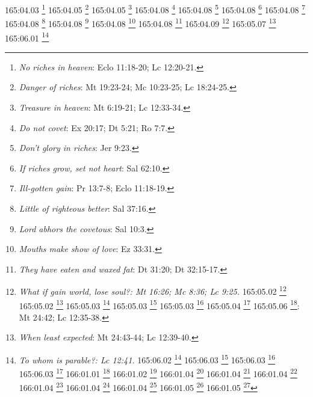 {{{{{{{{{{{{{{{{{{{{{{{{{{{{{{{{{{{{{{{{{{{{165:04.03 \footnote{\textit{No riches in heaven}: Eclo 11:18-20; Lc 12:20-21.}
165:04.05 \footnote{\textit{Danger of riches}: Mt 19:23-24; Mc 10:23-25; Lc 18:24-25.}
165:04.05 \footnote{\textit{Treasure in heaven}: Mt 6:19-21; Lc 12:33-34.}
165:04.08 \footnote{\textit{Do not covet}: Ex 20:17; Dt 5:21; Ro 7:7.}
165:04.08 \footnote{\textit{Don't glory in riches}: Jer 9:23.}
165:04.08 \footnote{\textit{If riches grow, set not heart}: Sal 62:10.}
165:04.08 \footnote{\textit{Ill-gotten gain}: Pr 13:7-8; Eclo 11:18-19.}
165:04.08 \footnote{\textit{Little of righteous better}: Sal 37:16.}
165:04.08 \footnote{\textit{Lord abhors the covetous}: Sal 10:3.}
165:04.08 \footnote{\textit{Mouths make show of love}: Ez 33:31.}
165:04.08 \footnote{\textit{They have eaten and waxed fat}: Dt 31:20; Dt 32:15-17.}
165:04.09 \footnote{\textit{What if gain world, lose soul?: Mt 16:26; Mc 8:36; Lc 9:25.}
165:05.02 \footnote{\textit{Be not anxious about things}: Mt 6:31.}
165:05.02 \footnote{\textit{God provides}: Mt 6:25-27; Lc 12:22-26.}
165:05.03 \footnote{\textit{Father provides needs}: Mt 6:31-32; Lc 12:29-30.}
165:05.03 \footnote{\textit{Real needs met}: Mt 6:33-34; Lc 12:31.}
165:05.03 \footnote{\textit{Ye of little faith}: Mt 6:28-30; Mt 8:26; Mt 14:31; Mt 16:8; Lc 12:27-28.}
165:05.04 \footnote{\textit{Heart follows treasure}: Mt 6:19-21; Lc 12:32-34.}
165:05.06 \footnote{\textit{Parable}: return from marriage feast}: Mt 24:42; Lc 12:35-38.}
165:05.07 \footnote{\textit{When least expected}: Mt 24:43-44; Lc 12:39-40.}
165:06.01 \footnote{\textit{To whom is parable?: Lc 12:41.}
165:06.02 \footnote{\textit{Trusted servant}: Mt 24:45-47; Lc 12:42-44.}
165:06.03 \footnote{\textit{Great Commission}: Mt 24:14; Mt 28:19-20a; Mc 13:10; Mc 16:15; Lc 24:47; Jn 17:18; Hch 1:8b.}
165:06.03 \footnote{\textit{No peace}: Lc 12:48a-53.}
165:06.03 \footnote{\textit{Slothful servant}: Mt 24:48-51; Lc 12:45-46.}
166:01.01 \footnote{\textit{Pharisee invited Jesus}: Lc 11:37.}
166:01.02 \footnote{\textit{Jesus not wash hands}: Lc 11:38.}
166:01.04 \footnote{\textit{Almsgiving not enough}: Mt 23:23; Lc 11:42.}
166:01.04 \footnote{\textit{Clean outside dirty inside}: Mt 23:25; Lc 11:39.}
166:01.04 \footnote{\textit{God looks at both inner & outer}: Lc 11:40-41.}
166:01.04 \footnote{\textit{God looks at motives}: Lc 16:15.}
166:01.04 \footnote{\textit{Wicked, self-righteous}: Mt 23:28.}
166:01.04 \footnote{\textit{Woe to seekers of honor}: Mt 23:6-7; Mc 12:36-39; Lc 11:43.}
166:01.05 \footnote{\textit{Lawyers hide knowledge}: Mt 23:13; Lc 11:52.}
166:01.05 \footnote{\textit{More "woes": Lc 11:45-50.}
}}}}}}}}}}}}}}}}}}}}}}}}}}}}}}}}}}}}}}}}}}}}}}
